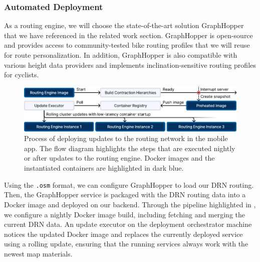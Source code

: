 \subsubsection{Automated Deployment}

As a routing engine, we will choose the state-of-the-art solution GraphHopper that we have referenced in the related work section. GraphHopper is open-source and provides access to community-tested bike routing profiles that we will reuse for route personalization. In addition, GraphHopper is also compatible with various height data providers and implements inclination-sensitive routing profiles for cyclists. 

\begin{figure}[t]
\centering
\includegraphics[width=\linewidth]{images/load-distribution-containerization-preheating.pdf}
\caption{Process of deploying updates to the routing network in the mobile app. The flow diagram highlights the steps that are executed nightly or after updates to the routing engine. Docker images and the instantiated containers are highlighted in dark blue.}
\label{fig:multi-stage-continuous-deployment}
\end{figure}

Using the \texttt{.osm} format, we can configure GraphHopper to load our DRN routing. Then, the GraphHopper service is packaged with the DRN routing data into a Docker image and deployed on our backend. Through the pipeline highlighted in , we configure a nightly Docker image build, including fetching and merging the current DRN data. An update executor on the deployment orchestrator machine notices the updated Docker image and replaces the currently deployed service using a rolling update, ensuring that the running services always work with the newest map materials. 

